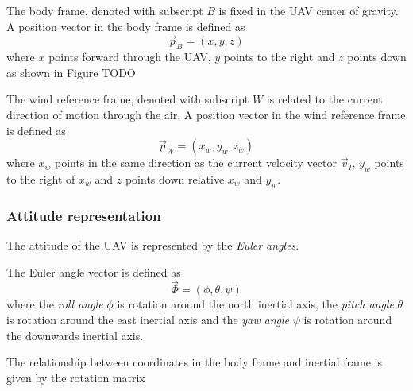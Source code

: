 \begin{definition}
    The body frame, denoted with subscript $B$ is fixed in the UAV center of gravity.
    A position vector in the body frame is defined as
    \begin{equation}
        \vec{p}_B = (x, y, z)
    \end{equation}
    where $x$ points forward through the UAV, $y$ points to the right and $z$ points down as shown in Figure TODO
\end{definition}

\begin{definition}
    The wind reference frame, denoted with subscript $W$ is related to the current direction of motion
    through the air.
    A position vector in the wind reference frame is defined as
    \begin{equation}
        \vec{p}_W = (x_w, y_w, z_w)
    \end{equation}
    where $x_w$ points in the same direction as the current velocity vector $\vec{v}_I$, 
    $y_w$ points to the right of $x_w$ and $z$ points down relative $x_w$ and $y_w$.
\end{definition}

\subsubsection{Attitude representation}
The attitude of the UAV is represented by the \textit{Euler angles}. 

\begin{definition}
The Euler angle vector is defined as
\begin{equation}
    \vec{\Phi}=(\phi, \theta, \psi)
\end{equation}
where the \textit{roll angle} $\phi$ is rotation around the north inertial axis, 
the \textit{pitch angle} $\theta$ is rotation around the east inertial axis and
the \textit{yaw angle} $\psi$ is rotation around the downwards inertial axis.
\end{definition}

The relationship between coordinates in the body frame and inertial frame is given
 by the rotation matrix

